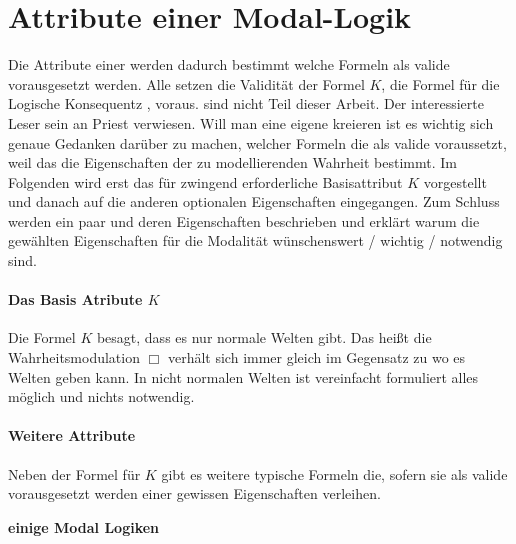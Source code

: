 

\section{Attribute einer Modal-Logik} %
\label{sub:attribute_einer_modal_logik}
Die Attribute einer \ML werden dadurch bestimmt welche Formeln als valide vorausgesetzt werden.
Alle \NML setzen die Validität der Formel $K$, die Formel für die Logische Konsequentz , voraus.
\NNML sind nicht Teil dieser Arbeit. Der interessierte Leser sein an Priest \cite[S.75ff]{Priest:2008} verwiesen.
Will man eine eigene \ML kreieren ist es wichtig sich genaue Gedanken darüber zu machen, welcher Formeln die als valide voraussetzt, weil das die Eigenschaften der zu modellierenden Wahrheit bestimmt.
Im Folgenden wird erst das für \NML zwingend erforderliche Basisattribut $K$ vorgestellt und danach auf die anderen optionalen Eigenschaften eingegangen.
Zum Schluss werden ein paar \NML und deren Eigenschaften beschrieben und erklärt warum die gewählten Eigenschaften für die Modalität wünschenswert / wichtig / notwendig sind.\\
%
\curr



\paragraph{Das Basis Atribute $K$} %
\label{par:das_basis_atribute_k_} Die Formel $K$ \KFormel besagt, dass es nur normale Welten gibt. Das heißt die Wahrheitsmodulation $\Box$ verhält sich immer gleich im Gegensatz zu \NNML wo es  Welten geben kann.
In nicht normalen Welten ist vereinfacht formuliert alles möglich und nichts notwendig.\cite[S.75]{Priest:2008}



\paragraph{Weitere Attribute} %
\label{par:weitere_attribute} 

Neben der Formel für $K$ gibt es weitere typische Formeln die, sofern sie als valide vorausgesetzt werden einer \NML gewissen Eigenschaften verleihen.


\textbf{einige Modal Logiken}



